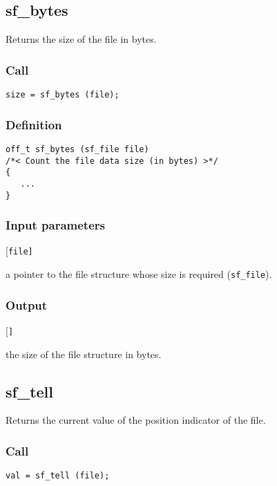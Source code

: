 \subsection{{sf\_bytes}}
Returns the size of the file in bytes.

\subsubsection*{Call}
\begin{verbatim}size = sf_bytes (file);\end{verbatim}

\subsubsection*{Definition}
\begin{verbatim}
off_t sf_bytes (sf_file file)
/*< Count the file data size (in bytes) >*/
{
   ...
}
\end{verbatim}

\subsubsection*{Input parameters}
\begin{desclist}{\tt }{\quad}[\tt file]
   \setlength\itemsep{0pt}
   \item[file] a pointer to the file structure whose size is required (\texttt{sf\_file}).  
\end{desclist}

\subsubsection*{Output}
\begin{desclist}{\tt }{\quad}[\tt ]
   \setlength\itemsep{0pt}
   \item[size] the size of the file structure in bytes.
\end{desclist}




\subsection{{sf\_tell}}
Returns the current value of the position indicator of the file.

\subsubsection*{Call}
\begin{verbatim}val = sf_tell (file);\end{verbatim}

